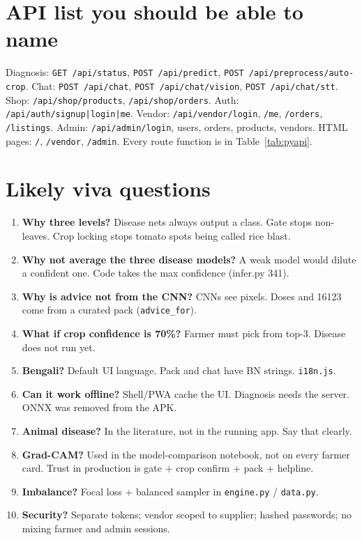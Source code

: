 \documentclass[Times,11pt,oneside,openany]{report}
\begin{document}
\chapter{API list you should be able to name}
Diagnosis: \texttt{GET /api/status}, \texttt{POST /api/predict}, \texttt{POST /api/preprocess/auto-crop}. Chat: \texttt{POST /api/chat}, \texttt{POST /api/chat/vision}, \texttt{POST /api/chat/stt}. Shop: \texttt{/api/shop/products}, \texttt{/api/shop/orders}. Auth: \texttt{/api/auth/signup|login|me}. Vendor: \texttt{/api/vendor/login}, \texttt{/me}, \texttt{/orders}, \texttt{/listings}. Admin: \texttt{/api/admin/login}, users, orders, products, vendors. HTML pages: \texttt{/}, \texttt{/vendor}, \texttt{/admin}. Every route function is in Table~\ref{tab:pyapi}.

\chapter{Likely viva questions}
\begin{enumerate}
    \item \textbf{Why three levels?} Disease nets always output a class. Gate stops non-leaves. Crop locking stops tomato spots being called rice blast.
    \item \textbf{Why not average the three disease models?} A weak model would dilute a confident one. Code takes the max confidence (infer.py 341).
    \item \textbf{Why is advice not from the CNN?} CNNs see pixels. Doses and 16123 come from a curated pack (\texttt{advice\_for}).
    \item \textbf{What if crop confidence is 70\%?} Farmer must pick from top-3. Disease does not run yet.
    \item \textbf{Bengali?} Default UI language. Pack and chat have BN strings. \texttt{i18n.js}.
    \item \textbf{Can it work offline?} Shell/PWA cache the UI. Diagnosis needs the server. ONNX was removed from the APK.
    \item \textbf{Animal disease?} In the literature, not in the running app. Say that clearly.
    \item \textbf{Grad-CAM?} Used in the model-comparison notebook, not on every farmer card. Trust in production is gate + crop confirm + pack + helpline.
    \item \textbf{Imbalance?} Focal loss + balanced sampler in \texttt{engine.py} / \texttt{data.py}.
    \item \textbf{Security?} Separate tokens; vendor scoped to supplier; hashed passwords; no mixing farmer and admin sessions.
\end{enumerate}
\end{document}
